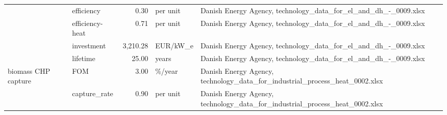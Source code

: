 \begin{longtable}{p{5cm}p{3cm}rp{3cm}p{11cm}}
                      & efficiency &           0.30 &                          per unit &                                                                                                                                                                                                                                                                      Danish Energy Agency, technology\_data\_for\_el\_and\_dh\_-\_0009.xlsx \\
                      & efficiency-heat &           0.71 &                          per unit &                                                                                                                                                                                                                                                                      Danish Energy Agency, technology\_data\_for\_el\_and\_dh\_-\_0009.xlsx \\
                      & investment &       3,210.28 &                          EUR/kW\_e &                                                                                                                                                                                                                                                                      Danish Energy Agency, technology\_data\_for\_el\_and\_dh\_-\_0009.xlsx \\
                      & lifetime &          25.00 &                             years &                                                                                                                                                                                                                                                                      Danish Energy Agency, technology\_data\_for\_el\_and\_dh\_-\_0009.xlsx \\
biomass CHP capture & FOM &           3.00 &                            \%/year &                                                                                                                                                                                                                                                          Danish Energy Agency, technology\_data\_for\_industrial\_process\_heat\_0002.xlsx \\
                      & capture\_rate &           0.90 &                          per unit &                                                                                                                                                                                                                                                          Danish Energy Agency, technology\_data\_for\_industrial\_process\_heat\_0002.xlsx \\

\end{longtable}
